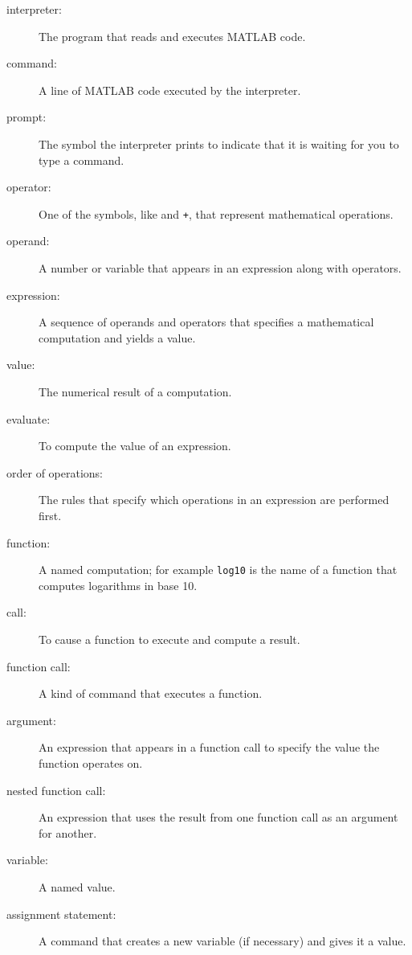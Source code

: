 \documentclass[
]{book}
\begin{document}
\begin{description}

\item[interpreter:] The program that reads and executes MATLAB code.

\item[command:] A line of MATLAB code executed by the interpreter.

\item[prompt:] The symbol the interpreter prints to indicate that it is
waiting for you to type a command.

\item[operator:] One of the symbols, like {\tt *} and {\tt +}, that
represent mathematical operations.

\item[operand:] A number or variable that appears in an expression along
with operators.

\item[expression:] A sequence of operands and operators that specifies
a mathematical computation and yields a value.

\item[value:] The numerical result of a computation.

\item[evaluate:] To compute the value of an expression.

\item[order of operations:] The rules that specify which operations
in an expression are performed first.

\item[function:] A named computation; for example {\tt log10} is the
name of a function that computes logarithms in base 10.

\item[call:] To cause a function to execute and compute a result.

\item[function call:] A kind of command that executes a function.

\item[argument:] An expression that appears in a function call to
specify the value the function operates on.

\item[nested function call:] An expression that uses the result from
one function call as an argument for another.

\item[variable:] A named value.

\item[assignment statement:] A command that creates a new variable
(if necessary) and gives it a value.


\end{description}
\end{document}
